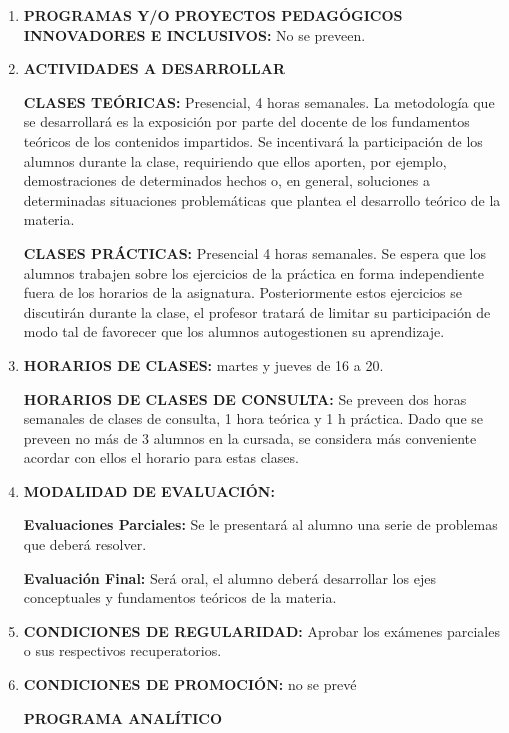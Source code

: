 \documentclass[12pt]{article}
\begin{document}
\begin{enumerate}
 \item\textbf{PROGRAMAS Y/O PROYECTOS PEDAGÓGICOS INNOVADORES E INCLUSIVOS:}  No se preveen.
  
 
 \item\textbf{  ACTIVIDADES A DESARROLLAR}

		  \textbf{ CLASES TEÓRICAS:} Presencial, 4 horas semanales. La metodología que se desarrollará es la exposición por parte del docente de los fundamentos teóricos de los contenidos impartidos. Se incentivará la participación de los alumnos durante la clase, requiriendo que ellos aporten, por ejemplo, demostraciones de determinados hechos o, en general, soluciones a determinadas situaciones problemáticas que plantea el desarrollo teórico de la materia.

		  \textbf{ CLASES PRÁCTICAS:} Presencial 4 horas semanales. Se espera que los alumnos trabajen sobre los ejercicios de la práctica en forma independiente fuera de los horarios de la asignatura. Posteriormente estos ejercicios se discutirán durante la clase,  el profesor tratará de limitar su participación de modo tal de favorecer que los alumnos autogestionen su aprendizaje.

\item\textbf{   HORARIOS DE CLASES:} martes y jueves de 16 a 20.

\textbf{   HORARIOS DE CLASES DE CONSULTA:} Se preveen dos horas semanales de clases de consulta, 1 hora teórica y 1 h práctica. Dado que se preveen no más de 3 alumnos en la cursada, se considera más conveniente acordar con ellos el horario para estas clases.  

 



\item\textbf{   MODALIDAD DE EVALUACIÓN:}

\textbf{Evaluaciones Parciales:}  Se le presentará al alumno una serie de problemas que deberá resolver.

\textbf{Evaluación Final:} Será oral, el alumno deberá desarrollar los ejes conceptuales y fundamentos teóricos de la materia.

\item\textbf{  CONDICIONES DE REGULARIDAD:}
Aprobar los exámenes parciales o sus respectivos recuperatorios.

\item\textbf{  CONDICIONES DE PROMOCIÓN:} no se prevé

\newpage

\begin{center}
 \textbf{PROGRAMA ANALÍTICO}
\end{center}

\end{enumerate}
\end{document}
